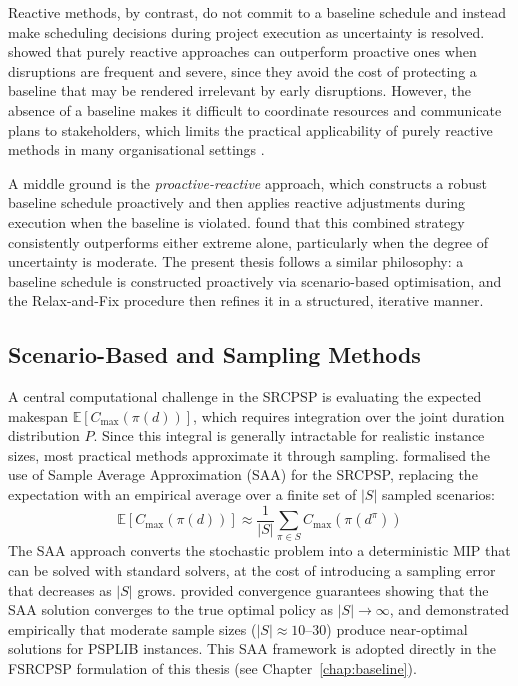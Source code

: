 Reactive methods, by contrast, do not commit to a baseline schedule and instead make
scheduling decisions during project execution as uncertainty is resolved.
\cite{VanDeVonder2005} showed that purely reactive approaches can outperform proactive
ones when disruptions are frequent and severe, since they avoid the cost of protecting
a baseline that may be rendered irrelevant by early disruptions. However, the absence of
a baseline makes it difficult to coordinate resources and communicate plans to
stakeholders, which limits the practical applicability of purely reactive methods in
many organisational settings \parencite{Herroelen2005}.

A middle ground is the \textit{proactive-reactive} approach, which constructs a robust
baseline schedule proactively and then applies reactive adjustments during execution
when the baseline is violated. \cite{VanDeVonder2008} found that this combined strategy
consistently outperforms either extreme alone, particularly when the degree of
uncertainty is moderate. The present thesis follows a similar philosophy:
a baseline schedule is constructed proactively via scenario-based optimisation, and
the Relax-and-Fix procedure then refines it in a structured, iterative manner.

\subsection*{Scenario-Based and Sampling Methods}
A central computational challenge in the SRCPSP is evaluating the expected makespan
$\mathbb{E}[C_{\max}(\pi(d))]$, which requires integration over the joint duration
distribution $P$. Since this integral is generally intractable for realistic instance
sizes, most practical methods approximate it through sampling. \cite{Lamas2016}
formalised the use of Sample Average Approximation (SAA) for the SRCPSP, replacing the
expectation with an empirical average over a finite set of $|S|$ sampled scenarios:
\begin{equation}
  \mathbb{E}[C_{\max}(\pi(d))]
  \approx \frac{1}{|S|} \sum_{\pi \in S} C_{\max}(\pi(d^\pi))
  \label{eq:saa_approx}
\end{equation}
The SAA approach converts the stochastic problem into a deterministic MIP that can be
solved with standard solvers, at the cost of introducing a sampling error that decreases
as $|S|$ grows. \cite{Lamas2016} provided convergence guarantees showing that the SAA
solution converges to the true optimal policy as $|S| \to \infty$, and demonstrated
empirically that moderate sample sizes ($|S| \approx 10$--$30$) produce near-optimal
solutions for PSPLIB instances. This SAA framework is adopted directly in the FSRCPSP
formulation of this thesis (see Chapter~\ref{chap:baseline}).

